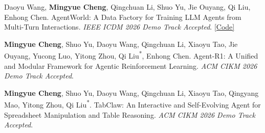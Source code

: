 \documentclass[UTF8,fontset=fandol,scheme=plain,11pt,a4paper]{ctexart}
\newcommand{\pubentry}[1]{\item \begin{minipage}[t]{\linewidth}#1\end{minipage}}
\begin{document}
\begin{publist}[start=4]
\pubentry{Daoyu Wang, \textbf{Mingyue Cheng}, Qingchuan Li, Shuo Yu, Jie Ouyang, Qi Liu, Enhong Chen. AgentWorld: A Data Factory for Training LLM Agents from Multi-Turn Interactions. \emph{IEEE ICDM 2026 Demo Track Accepted}. \href{https://github.com/AgentR1/Claw-R1}{[Code]}}

\pubentry{\textbf{Mingyue Cheng}, Shuo Yu, Daoyu Wang, Qingchuan Li, Xiaoyu Tao, Jie Ouyang, Yucong Luo, Yitong Zhou, Qi Liu\textsuperscript{*}, Enhong Chen. Agent-R1: A Unified and Modular Framework for Agentic Reinforcement Learning. \emph{ACM CIKM 2026 Demo Track Accepted}.}

\pubentry{\textbf{Mingyue Cheng}, Shuo Yu, Daoyu Wang, Qingchuan Li, Xiaoyu Tao, Qingyang Mao, Yitong Zhou, Qi Liu\textsuperscript{*}. TabClaw: An Interactive and Self-Evolving Agent for Spreadsheet Manipulation and Table Reasoning. \emph{ACM CIKM 2026 Demo Track Accepted}.}

\end{publist}

\end{document}

